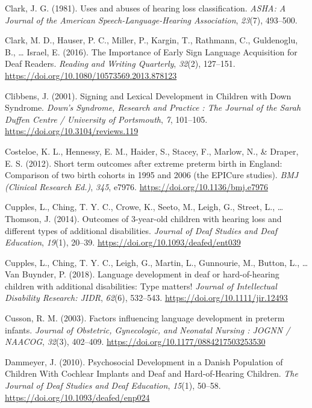 \documentclass[english,man]{apa6}
\begin{document}
\leavevmode\hypertarget{ref-clark1981}{}%
Clark, J. G. (1981). Uses and abuses of hearing loss classification. \emph{ASHA: A Journal of the American Speech-Language-Hearing Association}, \emph{23}(7), 493--500.

\leavevmode\hypertarget{ref-clark2016}{}%
Clark, M. D., Hauser, P. C., Miller, P., Kargin, T., Rathmann, C., Guldenoglu, B., \ldots{} Israel, E. (2016). The Importance of Early Sign Language Acquisition for Deaf Readers. \emph{Reading and Writing Quarterly}, \emph{32}(2), 127--151. \url{https://doi.org/10.1080/10573569.2013.878123}

\leavevmode\hypertarget{ref-clibbens2001}{}%
Clibbens, J. (2001). Signing and Lexical Development in Children with Down Syndrome. \emph{Down's Syndrome, Research and Practice : The Journal of the Sarah Duffen Centre / University of Portsmouth}, \emph{7}, 101--105. \url{https://doi.org/10.3104/reviews.119}

\leavevmode\hypertarget{ref-costeloe2012}{}%
Costeloe, K. L., Hennessy, E. M., Haider, S., Stacey, F., Marlow, N., \& Draper, E. S. (2012). Short term outcomes after extreme preterm birth in England: Comparison of two birth cohorts in 1995 and 2006 (the EPICure studies). \emph{BMJ (Clinical Research Ed.)}, \emph{345}, e7976. \url{https://doi.org/10.1136/bmj.e7976}

\leavevmode\hypertarget{ref-cupples2014}{}%
Cupples, L., Ching, T. Y. C., Crowe, K., Seeto, M., Leigh, G., Street, L., \ldots{} Thomson, J. (2014). Outcomes of 3-year-old children with hearing loss and different types of additional disabilities. \emph{Journal of Deaf Studies and Deaf Education}, \emph{19}(1), 20--39. \url{https://doi.org/10.1093/deafed/ent039}

\leavevmode\hypertarget{ref-cupples2018}{}%
Cupples, L., Ching, T. Y. C., Leigh, G., Martin, L., Gunnourie, M., Button, L., \ldots{} Van Buynder, P. (2018). Language development in deaf or hard-of-hearing children with additional disabilities: Type matters! \emph{Journal of Intellectual Disability Research: JIDR}, \emph{62}(6), 532--543. \url{https://doi.org/10.1111/jir.12493}

\leavevmode\hypertarget{ref-cusson2003}{}%
Cusson, R. M. (2003). Factors influencing language development in preterm infants. \emph{Journal of Obstetric, Gynecologic, and Neonatal Nursing : JOGNN / NAACOG}, \emph{32}(3), 402--409. \url{https://doi.org/10.1177/0884217503253530}

\leavevmode\hypertarget{ref-dammeyer2010}{}%
Dammeyer, J. (2010). Psychosocial Development in a Danish Population of Children With Cochlear Implants and Deaf and Hard-of-Hearing Children. \emph{The Journal of Deaf Studies and Deaf Education}, \emph{15}(1), 50--58. \url{https://doi.org/10.1093/deafed/enp024}
\end{document}
